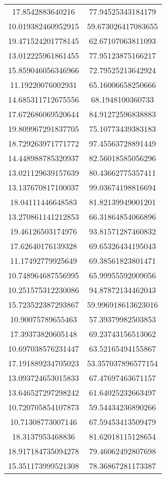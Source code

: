 \begin{table}
\begin{tabular}{cc}
17.8542883640216 & 77.94525343184179 \\
10.019382460952915 & 59.673026417083655 \\
19.471524201778145 & 62.67107063811093 \\
13.012225961861455 & 77.95123875166217 \\
15.859046056346966 & 72.79525213642924 \\
11.19220076002931 & 65.16006658250666 \\
14.685311712675556 & 68.1948100360733 \\
17.672686069520644 & 84.91272596838883 \\
19.809967291837705 & 75.10773439383183 \\
18.729263971771772 & 97.45563728891449 \\
14.448988785320937 & 82.56018585056296 \\
13.021129639157639 & 80.43662775357411 \\
13.137670817100037 & 99.03674198816694 \\
18.04111446648583 & 81.82139949001201 \\
13.270861141212853 & 66.31864854066896 \\
19.46126503174976 & 93.81571287460832 \\
17.62640176139328 & 69.65326434195043 \\
11.17492779925649 & 69.38561823801471 \\
10.748964687556995 & 65.99955592009056 \\
10.251575312230086 & 94.87872134462043 \\
15.723522387293867 & 59.996918613623016 \\
10.90075789655463 & 57.39379982503853 \\
17.39373820605148 & 69.23743156513062 \\
10.697038576231447 & 63.52165494155867 \\
17.191889234705023 & 53.357037896577154 \\
13.093724653015833 & 67.47697463671157 \\
13.646527297298242 & 61.64025232663497 \\
10.720705854107873 & 59.54434236890266 \\
10.71308773007146 & 67.59453413509479 \\
18.3137953468836 & 81.62018115128654 \\
18.917184735094278 & 79.46062492807698 \\
15.351173999521308 & 78.36867281173387 \\

\end{tabular}
\end{table}
